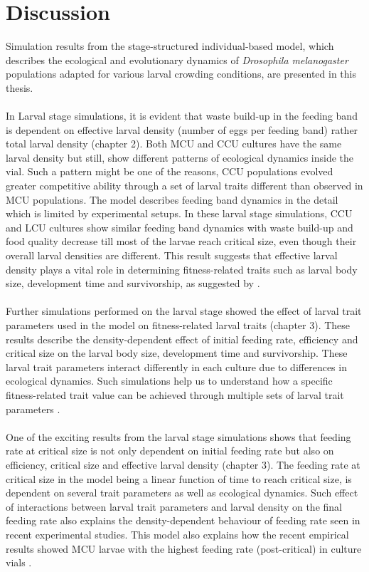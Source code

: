 \chapter{Discussion}
Simulation results from the stage-structured individual-based model, which describes the ecological and evolutionary dynamics of \textit{Drosophila melanogaster} populations adapted for various larval crowding conditions, are presented in this thesis.\\\\
In Larval stage simulations, it is evident that waste build-up in the feeding band is dependent on effective larval density (number of eggs per feeding band) rather total larval density (chapter 2). Both MCU and CCU cultures have the same larval density but still, show different patterns of ecological dynamics inside the vial. Such a pattern might be one of the reasons, CCU populations evolved greater competitive ability through a set of larval traits different than observed in MCU populations. The model describes feeding band dynamics in the detail which is limited by experimental setups. In these larval stage simulations, CCU and LCU cultures show similar feeding band dynamics with waste build-up and food quality decrease till most of the larvae reach critical size, even though their overall larval densities are different. This result suggests that effective larval density plays a vital role in determining fitness-related traits such as larval body size, development time and survivorship, as suggested by \citep{sarangiEcologicalDetailsMediate2018}.\\\\
Further simulations performed on the larval stage showed the effect of larval trait parameters used in the model on fitness-related larval traits (chapter 3). These results describe the density-dependent effect of initial feeding rate, efficiency and critical size on the larval body size, development time and survivorship. These larval trait parameters interact differently in each culture due to differences in ecological dynamics. Such simulations help us to understand how a specific fitness-related trait value can be achieved through multiple sets of larval trait parameters \citep{sarangiEvolutionIncreasedLarval2016}.\\\\
One of the exciting results from the larval stage simulations shows that feeding rate at critical size is not only dependent on initial feeding rate but also on efficiency, critical size and effective larval density (chapter 3). The feeding rate at critical size in the model being a linear function of time to reach critical size, is dependent on several trait parameters as well as ecological dynamics. Such effect of interactions between larval trait parameters and larval density on the final feeding rate also explains the density-dependent behaviour of feeding rate seen in recent experimental studies. This model also explains how the recent empirical results showed MCU larvae with the highest feeding rate (post-critical) in culture vials \citep{sarangiEcologicalDetailsMediate2018}.\\\\
